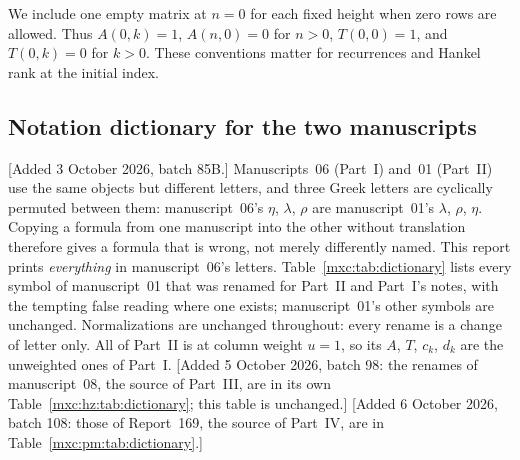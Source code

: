 \documentclass[11pt]{article}
\numberwithin{equation}{section}
\theoremstyle{definition}
\theoremstyle{remark}
\begin{document}
We include one empty matrix at $n=0$ for each fixed height when zero rows
are allowed. Thus $A(0,k)=1$, $A(n,0)=0$ for $n>0$,
$T(0,0)=1$, and $T(0,k)=0$ for $k>0$. These conventions matter for
recurrences and Hankel rank at the initial index.

\subsection{Notation dictionary for the two manuscripts}\label{mxc:sec:dictionary}
[Added 3 October 2026, batch 85B.] Manuscripts~06 (Part~I) and~01
(Part~II) use the same objects but different letters, and three Greek
letters are cyclically permuted between them: manuscript~06's $\eta$,
$\lambda$, $\rho$ are manuscript~01's $\lambda$, $\rho$, $\eta$. Copying a
formula from one manuscript into the other without translation therefore
gives a formula that is wrong, not merely differently named. This report
prints \emph{everything} in manuscript~06's letters. Table~\ref{mxc:tab:dictionary}
lists every symbol of manuscript~01 that was renamed for Part~II and Part~I's
notes, with the tempting false reading where one exists; manuscript~01's
other symbols are unchanged. Normalizations are unchanged throughout:
every rename is a change of letter only. All of Part~II is at column
weight $u=1$, so its $A$, $T$, $c_k$, $d_k$ are the unweighted ones of
Part~I.
[Added 5 October 2026, batch 98: the renames of manuscript~08, the source of
Part~III, are in its own Table~\ref{mxc:hz:tab:dictionary}; this table is
unchanged.] [Added 6 October 2026, batch 108: those of Report~169, the source
of Part~IV, are in Table~\ref{mxc:pm:tab:dictionary}.]
\end{document}
